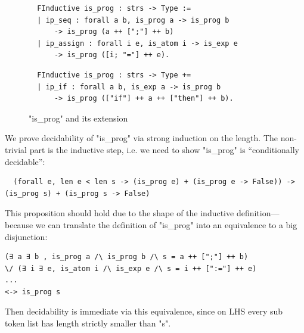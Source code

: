 \begin{figure}[!htb]
  
  \begin{minipage}{\textwidth}
  \begin{multicols}{2}
  

  
  \begin{lstlisting}
  FInductive is_prog : strs -> Type := 
  | ip_seq : forall a b, is_prog a -> is_prog b 
      -> is_prog (a ++ [";"] ++ b) 
  | ip_assign : forall i e, is_atom i -> is_exp e 
      -> is_prog ([i; "="] ++ e).  
  \end{lstlisting}
  
  
  \columnbreak
  
  \begin{lstlisting}
  FInductive is_prog : strs -> Type += 
  | ip_if : forall a b, is_exp a -> is_prog b 
      -> is_prog (["if"] ++ a ++ ["then"] ++ b). 
  \end{lstlisting}
  
  
  
  
  \end{multicols}
  \end{minipage}
  \caption{"is_prog" and its extension}
  \end{figure}



We prove decidability of "is_prog" via strong induction on the length. The non-trivial part is  the inductive step, i.e. we need to show "is_prog" is ``conditionally decidable'':
\begin{verbatim}
  (forall e, len e < len s -> (is_prog e) + (is_prog e -> False)) -> (is_prog s) + (is_prog s -> False)
\end{verbatim}

This proposition should hold due to the shape of the inductive definition---because we can translate the definition of "is_prog" into an equivalence to a big disjunction: 
\begin{verbatim}
(∃ a ∃ b , is_prog a /\ is_prog b /\ s = a ++ [";"] ++ b)
\/ (∃ i ∃ e, is_atom i /\ is_exp e /\ s = i ++ [":="] ++ e) 
... 
<-> is_prog s
\end{verbatim}
Then decidability is immediate via this equivalence, since on LHS every sub token list has length strictly smaller than "s". 

